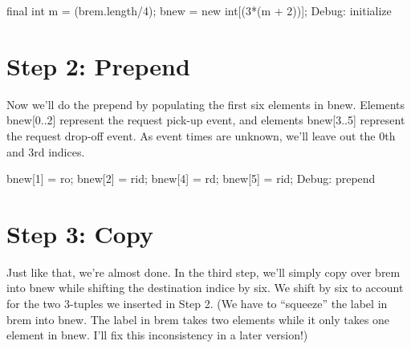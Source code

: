\nwenddocs{}\endmoddef\nwstartdeflinemarkup{}\nwenddeflinemarkup
final int m = (brem.length/4);
bnew = new int[(3*(m + 2))];
\LA{}Debug: initialize~{\nwtagstyle{}}\RA{}
\nwendcode{}\nwdocspar

\section{Step 2: Prepend}

Now we'll do the prepend by populating the first six elements in {\Tt{}bnew\nwendquote}.
Elements {\Tt{}bnew[0..2]\nwendquote} represent the request pick-up event, and elements
{\Tt{}bnew[3..5]\nwendquote} represent the request drop-off event. As event times are
unknown, we'll leave out the 0th and 3rd indices.

\nwenddocs{}\endmoddef\nwstartdeflinemarkup{}\nwenddeflinemarkup
bnew[1] = ro;
bnew[2] = rid;
bnew[4] = rd;
bnew[5] = rid;
\LA{}Debug: prepend~{\nwtagstyle{}}\RA{}
\nwendcode{}\nwdocspar

\section{Step 3: Copy}

Just like that, we're almost done. In the third step, we'll simply copy over
{\Tt{}brem\nwendquote} into {\Tt{}bnew\nwendquote} while shifting the destination indice by six. We shift
by six to account for the two 3-tuples we inserted in Step 2. (We have to
``squeeze'' the label in {\Tt{}brem\nwendquote} into {\Tt{}bnew\nwendquote}. The label in {\Tt{}brem\nwendquote} takes
two elements while it only takes one element in {\Tt{}bnew\nwendquote}. I'll fix this
inconsistency in a later version!)

